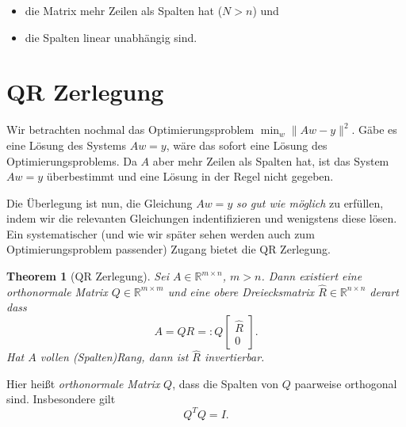 \documentclass[]{book}
\providecommand{\tightlist}{%
  \setlength{\itemsep}{0pt}\setlength{\parskip}{0pt}}
\newtheorem{theorem}{Theorem}[chapter]
\theoremstyle{definition}
\theoremstyle{definition}
\theoremstyle{definition}
\theoremstyle{definition}
\theoremstyle{remark}
\begin{document}
\begin{itemize}
\tightlist
\item
  die Matrix mehr Zeilen als Spalten hat (\(N>n\)) und
\item
  die Spalten linear unabhängig sind.
\end{itemize}

\hypertarget{qr-zerlegung}{%
\section{QR Zerlegung}\label{qr-zerlegung}}

Wir betrachten nochmal das Optimierungsproblem \(\min_{w} \| Aw - y \|^2\). Gäbe es eine Lösung des Systems \(Aw=y\), wäre das sofort eine Lösung des Optimierungsproblems. Da \(A\) aber mehr Zeilen als Spalten hat, ist das System \(Aw=y\) überbestimmt und eine Lösung in der Regel nicht gegeben.

Die Überlegung ist nun, die Gleichung \(Aw=y\) \emph{so gut wie möglich} zu erfüllen, indem wir die relevanten Gleichungen indentifizieren und wenigstens diese lösen. Ein systematischer (und wie wir später sehen werden auch zum Optimierungsproblem passender) Zugang bietet die QR Zerlegung.

\begin{theorem}[QR Zerlegung]
\protect\hypertarget{thm:qr}{}\label{thm:qr}Sei \(A\in \mathbb R^{m\times n}\), \(m>n\). Dann existiert eine orthonormale Matrix \(Q\in \mathbb R^{m\times m}\) und eine obere Dreiecksmatrix \(\hat R\in \mathbb R^{n\times n}\) derart dass
\begin{equation*}
A = QR =: Q 
\begin{bmatrix}
\hat R \\ 0
\end{bmatrix}.
\end{equation*}
Hat \(A\) vollen (Spalten)Rang, dann ist \(\hat R\) invertierbar.
\end{theorem}

Hier heißt \emph{orthonormale Matrix} \(Q\), dass die Spalten von \(Q\) paarweise orthogonal sind. Insbesondere gilt
\begin{equation*}
Q^T Q = I.
\end{equation*}
\end{document}
